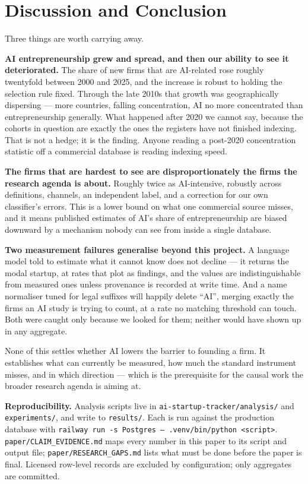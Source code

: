 \documentclass[11pt]{article}
\begin{document}
\section{Discussion and Conclusion}

Three things are worth carrying away.

\textbf{AI entrepreneurship grew and spread, and then our ability to see it
deteriorated.} The share of new firms that are AI-related rose roughly
twentyfold between 2000 and 2025, and the increase is robust to holding the
selection rule fixed. Through the late 2010s that growth was geographically
dispersing --- more countries, falling concentration, AI no more concentrated
than entrepreneurship generally. What happened after 2020 we cannot say,
because the cohorts in question are exactly the ones the registers have not
finished indexing. That is not a hedge; it is the finding. Anyone reading a
post-2020 concentration statistic off a commercial database is reading indexing
speed.

\textbf{The firms that are hardest to see are disproportionately the firms the
research agenda is about.} Roughly twice as AI-intensive, robustly across
definitions, channels, an independent label, and a correction for our own
classifier's errors. This is a lower bound on what one commercial source
misses, and it means published estimates of AI's share of entrepreneurship are
biased downward by a mechanism nobody can see from inside a single database.

\textbf{Two measurement failures generalise beyond this project.} A language
model told to estimate what it cannot know does not decline --- it returns the
modal startup, at rates that plot as findings, and the values are
indistinguishable from measured ones unless provenance is recorded at write
time. And a name normaliser tuned for legal suffixes will happily delete
``AI'', merging exactly the firms an AI study is trying to count, at a rate no
matching threshold can touch. Both were caught only because we looked for them;
neither would have shown up in any aggregate.

None of this settles whether AI lowers the barrier to founding a firm. It
establishes what can currently be measured, how much the standard instrument
misses, and in which direction --- which is the prerequisite for the causal
work the broader research agenda is aiming at.

\vspace{1em}
\noindent\textbf{Reproducibility.} Analysis scripts live in
\texttt{ai-startup-tracker/analysis/} and \texttt{experiments/}, and write to
\texttt{results/}. Each is run against the production database with
\texttt{railway run -s Postgres -- .venv/bin/python <script>}.
\texttt{paper/CLAIM\_EVIDENCE.md} maps every number in this paper to its script
and output file; \texttt{paper/RESEARCH\_GAPS.md} lists what must be done before
the paper is final. Licensed row-level records are excluded by configuration;
only aggregates are committed.

\newpage

\end{document}
